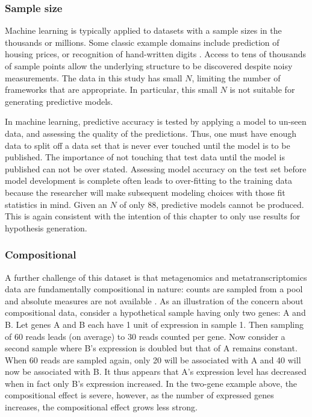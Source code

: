 \subsubsection{Sample size}
Machine learning is typically applied to datasets with a sample sizes in the thousands or millions.
Some classic example domains include prediction of housing prices, or recognition of hand-written digits \cite{friedman2001}.
Access to tens of thousands of sample points allow the underlying structure to be discovered despite noisy measurements.
The data in this study has small $N$, limiting the number of frameworks that are appropriate.
In particular, this small $N$ is not suitable for generating predictive models.

In machine learning, predictive accuracy is tested by applying a model to un-seen data, and assessing the quality of the predictions.
Thus, one must have enough data to split off a data set that is never ever touched until the model is to be published.
The importance of not touching that test data until the model is published can not be over stated.
Assessing model accuracy on the test set before model development is complete often leads to over-fitting to the training data because the researcher will make subsequent modeling choices with those fit statistics in mind.
Given an $N$ of only 88, predictive models cannot be produced.
This is again consistent with the intention of this chapter to only use results for hypothesis generation.

\subsubsection{Compositional}
A further challenge of this dataset is that metagenomics and metatranscriptomics data are fundamentally compositional in nature: counts are sampled from a pool and absolute measures are not available \cite{tsilimigras2016, aitchison1982}.
As an illustration of the concern about compositional data, consider a hypothetical sample having only two genes: A and B.
Let genes A and B each have 1 unit of expression in sample 1.
Then sampling of 60 reads leads (on average) to 30 reads counted per gene.
Now consider a second sample where B's expression is doubled but that of A remains constant.  When 60 reads are sampled again, only 20 will be associated with A and 40 will now be associated with B.
It thus appears that A's expression level has decreased when in fact only B's expression increased.
In the two-gene example above, the compositional effect is severe, however, as the number of expressed genes increases, the compositional effect grows less strong.

